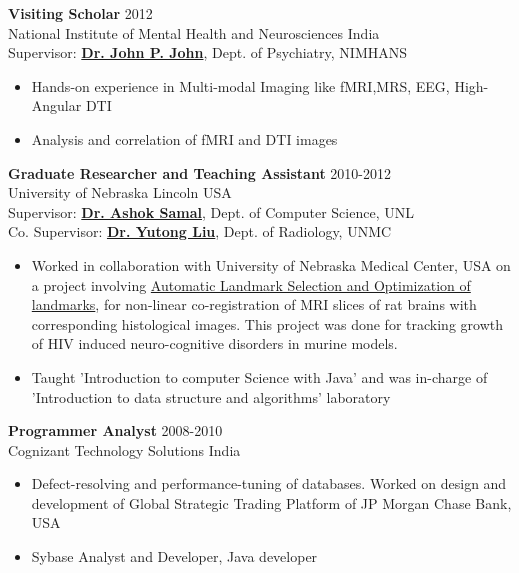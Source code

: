 \documentclass[line, margin]{res}
\begin{document}
\begin{resume}
\textbf{Visiting Scholar} \hfill 2012\\
National Institute of Mental Health and Neurosciences \hfill India\\
Supervisor: \href{http://mbial.weebly.com/dr-john-p-john.html}{\textbf{Dr. John P. John}}, Dept. of Psychiatry, NIMHANS
\begin{itemize}
    \item Hands-on experience in Multi-modal Imaging like fMRI,MRS, EEG, High-Angular DTI
    \item Analysis and correlation of fMRI and DTI images
\end{itemize}



\textbf{Graduate Researcher and Teaching Assistant} \hfill 2010-2012\\
University of Nebraska Lincoln \hfill USA\\
Supervisor: \href{http://cse.unl.edu/~samal/}{\textbf{Dr. Ashok Samal}}, Dept. of Computer Science, UNL\\
Co. Supervisor: \href{http://www.unmc.edu/radiology/faculty/liu.html}{\textbf{Dr. Yutong Liu}}, Dept. of Radiology, UNMC

\begin{itemize}
    \item Worked in collaboration with University of Nebraska Medical Center, USA on a project involving \href{http://digitalcommons.unl.edu/computerscidiss/45/}{Automatic Landmark Selection and Optimization of landmarks}, for non-linear co-registration of MRI slices of rat brains with corresponding histological images. This project was done for tracking growth of HIV induced neuro-cognitive disorders in murine models.
    \item Taught 'Introduction to computer Science with Java' and was in-charge of 'Introduction to data structure and algorithms' laboratory
\end{itemize}


\textbf{Programmer Analyst} \hfill 2008-2010\\
Cognizant Technology Solutions \hfill India\\

\begin{itemize}
    \item Defect-resolving and performance-tuning of databases. Worked on design and development of Global Strategic Trading Platform of JP Morgan Chase Bank, USA
    \item Sybase Analyst and Developer, Java developer
\end{itemize}



\end{resume}
\end{document}
